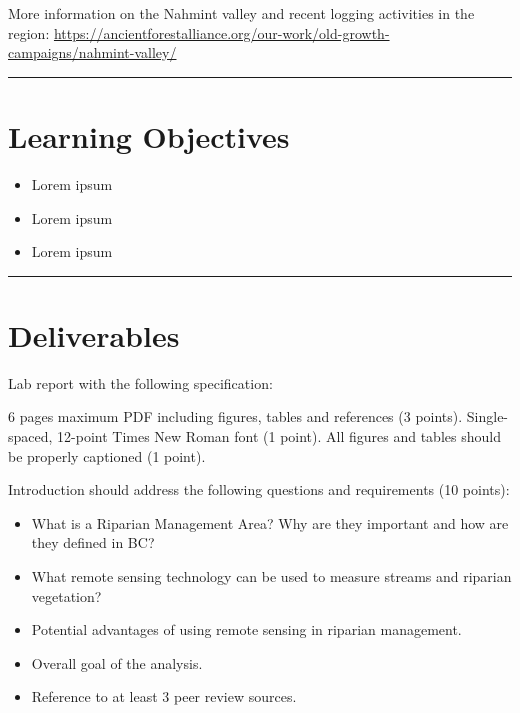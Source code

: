 \documentclass[
]{book}
\providecommand{\tightlist}{%
  \setlength{\itemsep}{0pt}\setlength{\parskip}{0pt}}
\begin{document}
More information on the Nahmint valley and recent logging activities in the region: \url{https://ancientforestalliance.org/our-work/old-growth-campaigns/nahmint-valley/}

\begin{center}\rule{0.5\linewidth}{0.5pt}\end{center}

\hypertarget{learning-objectives-2}{%
\section*{Learning Objectives}\label{learning-objectives-2}}

\begin{itemize}
\tightlist
\item
  Lorem ipsum
\item
  Lorem ipsum
\item
  Lorem ipsum
\end{itemize}

\begin{center}\rule{0.5\linewidth}{0.5pt}\end{center}

\hypertarget{lab3-deliverables}{%
\section*{Deliverables}\label{lab3-deliverables}}

Lab report with the following specification:

6 pages maximum PDF including figures, tables and references (3 points). Single-spaced, 12-point Times New Roman font (1 point). All figures and tables should be properly captioned (1 point).

Introduction should address the following questions and requirements (10 points):

\begin{itemize}
\item
  What is a Riparian Management Area? Why are they important and how are they defined in BC?
\item
  What remote sensing technology can be used to measure streams and riparian vegetation?
\item
  Potential advantages of using remote sensing in riparian management.
\item
  Overall goal of the analysis.
\item
  Reference to at least 3 peer review sources.
\end{itemize}
\end{document}

